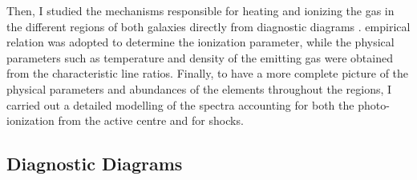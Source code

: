 \documentclass[../thesis.tex]{subfiles}
\begin{document}
Then, I studied the mechanisms responsible for heating and ionizing the gas in the different regions of both galaxies  directly from diagnostic diagrams \citep{Baldwin81,Veilleux87}. 
\citet{Penston90} empirical relation was adopted to determine the ionization parameter, while the physical parameters such as temperature and density of the emitting gas were obtained from the characteristic line ratios.
Finally, to have a more complete picture of the physical parameters and abundances of the elements throughout the regions, I carried out a detailed modelling of the spectra accounting for both the photo-ionization from the active centre and for shocks.

\subsection{Diagnostic Diagrams}
\label{sec:diag}
\end{document}
